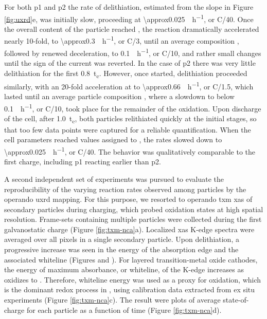 \documentclass{article}
\begin{document}
For both \gls{p1} and \gls{p2} the rate of delithiation, estimated
from the slope in Figure \ref{fig:uxrd}e, was initially slow,
proceeding at \SI{\approx0.025}{\per\hour}, or C/40. Once the
overall content of the particle reached
, the reaction dramatically
accelerated nearly 10-fold, to \SI{\approx0.3}{\per\hour}, or
C/3, until an average composition , followed by renewed
deceleration, to \SI{0.1}{\per\hour}, or C/10, and rather small
changes until the sign of the current was reverted. In the case of
\gls{p2} there was very little delithiation for the first
\SI{0.8}{t_c}. However, once started, delithiation proceeded
similarly, with an 20-fold acceleration at  to
\SI{\approx0.66}{\per\hour}, or C/1.5, which lasted until an
average particle composition , where a slowdown to below
\SI{0.1}{\per\hour}, or C/10, took place for the remainder of
the oxidation. Upon discharge of the cell, after \SI{1.0}{t_c}, both
particles relithiated quickly at the initial stages, so that too few
data points were captured for a reliable quantification. When the cell
parameters reached values assigned to
, the rates slowed down to
\SI{\approx0.025}{\per\hour}, or C/40. The behavior was
qualitatively comparable to the first charge, including \gls{p1}
reacting earlier than \gls{p2}.




A second independent set of experiments was pursued to evaluate the
reproducibility of the varying reaction rates observed among particles
by the operando \gls{uxrd} mapping. For this purpose, we resorted to
operando \Gls{txm} \gls{xas} of \nca{} secondary particles during
charging, which probed  oxidation states at high spatial
resolution. Frame-sets containing multiple particles were collected
during the first galvanostatic charge (Figure
\ref{fig:txm-nca}a). Localized \gls{xas} K-edge spectra were averaged
over all pixels in a single secondary particle. Upon delithiation, a
progressive increase was seen in the energy of the absorption edge and
the associated whiteline (Figures  and
). For layered transition-metal oxide cathodes,
the energy of maximum absorbance, or whiteline, of the  K-edge
increases as  oxidizes to . Therefore,
whiteline energy was used as a proxy for  oxidation, which is
the dominant redox process in \nca{}, using calibration data extracted
from ex situ experiments (Figure \ref{fig:txm-nca}c). The result were
plots of average state-of-charge for each particle as a function of
time (Figure \ref{fig:txm-nca}d).
\end{document}
